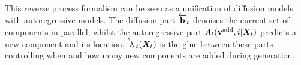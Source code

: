 This reverse process formalism can be seen as a unification of diffusion models with autoregressive models. The diffusion part $\overleftarrow{\mathbf{b}}_t$ denoises the current set of components in parallel, whilst the autoregressive part $A_t({\mathbf{v}}^{\textup{add}}, i | {\bm{X}}_t)$ predicts a new component and its location. $\overleftarrow{\lambda}_t({\bm{X}}_t)$ is the glue between these parts controlling when and how many new components are added during generation.


